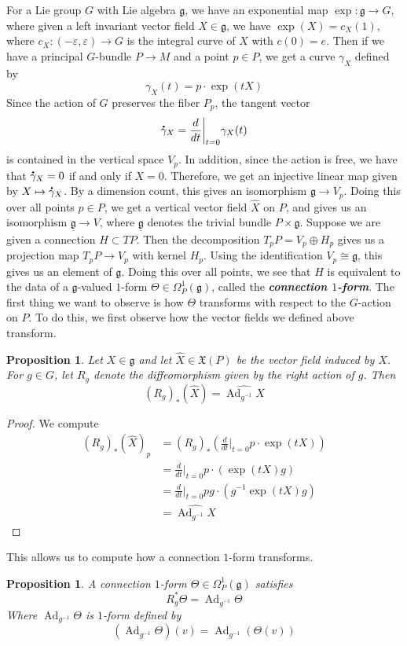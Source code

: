\documentclass[psamsfonts, 12pt]{amsart}
\newtheorem{prop}[thm]{Proposition}
\theoremstyle{definition}
\theoremstyle{remark}
\newcommand{\ib}[1]{\textbf{\textit{#1}}}
\newcommand{\g}{\mathfrak{g}}
\newcommand*{\dt}[1]{%
   \accentset{\mbox{\large\bfseries .}}{#1}}
\newcommand{\inv}{^{-1}}
\DeclareMathOperator{\Ad}{Ad}
\begin{document}
For a Lie group $G$ with Lie algebra $\g$, we have an exponential map
$\exp : \g \to G$, where given a left invariant vector field $X \in \g$, we have
$\exp(X) = c_X(1)$, where $c_X : (-\varepsilon, \varepsilon) \to G$
is the integral curve of $X$ with $c(0) = e$. Then if we have a principal $G$-bundle
$P \to M$ and a point $p \in P$, we get a curve $\gamma_X$ defined by
\[
\gamma_X(t) = p\cdot \exp(tX)
\]
Since the action of $G$ preserves the fiber $P_p$, the tangent vector
\[
\dt{\gamma}_X = \frac{d}{dt}\bigg\vert_{t=0}\gamma_X(t)
\]
is contained in the vertical space $V_p$. In addition, since the action is free,
we have that $\dt{\gamma}_X = 0$ if and only if $X = 0$. Therefore, we get
an injective linear map given by $X \mapsto \dt{\gamma}_X$. By a dimension count,
this gives an isomorphism $\g \to V_p$. Doing this over all points $p \in P$, we get
a vertical vector field $\widehat{X}$ on $P$, and gives us an isomorphism
$\underline{\g} \to V$, where $\underline{\g}$ denotes the trivial bundle $P \times \g$.
Suppose we are given a connection $H \subset TP$. Then the decomposition
$T_pP = V_p \oplus H_p$ gives us a projection map $T_pP \to V_p$ with kernel $H_p$.
Using the identification $V_p \cong \g$, this gives us an element of $\g$. Doing
this over all points, we see that $H$ is equivalent to the data of a
$\g$-valued $1$-form $\Theta \in \Omega^1_P(\g)$, called the \ib{connection $1$-form}.
The first thing we want to observe is how $\Theta$ transforms with respect to
the $G$-action on $P$. To do this, we first observe how the vector fields
we defined above transform.
%
\begin{prop}
Let $X \in \g$ and let $\widehat{X} \in \mathfrak{X}(P)$ be the vector field
induced by $X$. For $g \in G$, let $R_g$ denote the diffeomorphism given by
the right action of $g$. Then
\[
(R_g)_*(\widehat{X}) = \widehat{\Ad_{g\inv}X}
\]
\end{prop}
%
\begin{proof}
We compute
\begin{align*}
(R_g)_*(\widehat{X})_p
&= (R_g)_* \left( \frac{d}{dt}\bigg\vert_{t=0}p\cdot\exp(tX) \right) \\
&= \frac{d}{dt}\bigg\vert_{t=0}p\cdot(\exp(tX)g) \\
&= \frac{d}{dt}\bigg\vert_{t=0}pg\cdot(g\inv\exp(tX)g) \\[5pt]
&= \widehat{\Ad_{g\inv} X}
\end{align*}
\end{proof}
%
This allows us to compute how a connection $1$-form transforms.
%
\begin{prop}
A connection $1$-form $\Theta \in \Omega^1_P(\g)$ satisfies
\[
R_g^*\Theta = \Ad_{g\inv}\Theta
\]
Where $\Ad_{g\inv}\Theta$ is $1$-form defined by
\[
(\Ad_{g\inv}\Theta)(v) = \Ad_{g\inv}(\Theta(v))
\]
\end{prop}
\end{document}
